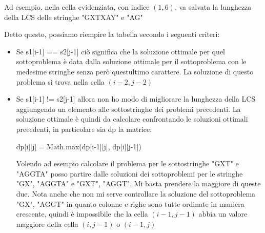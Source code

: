 %
\begin{minipage}[c]{0.30\textwidth}
	Ad esempio, nella cella evidenziata, con indice $ \left(1,6\right) $, va salvata la lunghezza della LCS delle stringhe "GXTXAY" e "AG"
\end{minipage}
\vskip3mm
Detto questo, possiamo riempire la tabella secondo i seguenti criteri:
\begin{itemize}
	\item Se {\ttfamily s1[i-1] == s2[j-1]} ciò significa che la soluzione ottimale per quel sottoproblema è data dalla soluzione ottimale per il sottoproblema con le medesime stringhe senza però questultimo carattere. La soluzione di questo problema si trova nella cella $ \left(i-2, j-2\right) $
	\item Se {\ttfamily s1[i-1] != s2[j-1]} allora non ho modo di migliorare la lunghezza della LCS aggiungendo un elemento alle sottostringhe dei problemi precedenti. La soluzione ottimale è quindi da calcolare confrontando le soluzioni ottimali precedenti, in particolare sia {\ttfamily dp} la matrice:
	      \begin{center}
		      \ttfamily dp[i][j] = Math.max(dp[i-1][j], dp[i][j-1])
	      \end{center}
	      Volendo ad esempio calcolare il problema per le sottostringhe "GXT" e "AGGTA" posso partire dalle soluzioni dei sottoproblemi per le stringhe "GX", "AGGTA" e "GXT", "AGGT". Mi basta prendere la maggiore di queste due.
	      \vskip3mm
	      Nota anche che non mi serve controllare la soluzione del sottoproblema "GX", "AGGT" in quanto colonne e righe sono tutte ordinate in maniera crescente, quindi è impossibile che la cella $ \left(i-1, j-1\right) $ abbia un valore maggiore della cella $ \left(i, j-1\right) $ o $ \left(i-1, j\right) $
\end{itemize}

